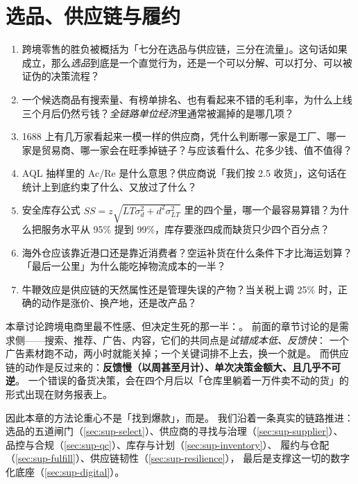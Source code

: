 \chapter{选品、供应链与履约}
\label{ch:supply}

\begin{insight}[本章要解决的问题]
\begin{enumerate}
  \item 跨境零售的胜负被概括为「七分在选品与供应链，三分在流量」。这句话如果成立，那么\emph{选品}到底是一个直觉行为，还是一个可以分解、可以打分、可以被证伪的决策流程？
  \item 一个候选商品有搜索量、有榜单排名、也有看起来不错的毛利率，为什么上线三个月后仍然亏钱？\emph{全链路单位经济}里通常被漏掉的是哪几项？
  \item 1688 上有几万家看起来一模一样的供应商，凭什么判断哪一家是工厂、哪一家是贸易商、哪一家会在旺季掉链子？与应该看什么、花多少钱、值不值得？
  \item AQL 抽样里的 Ac/Re 是什么意思？供应商说「我们按 2.5 收货」，这句话在统计上到底约束了什么、又放过了什么？
  \item 安全库存公式 $SS = z\sqrt{LT\sigma_d^2 + d^2\sigma_{LT}^2}$ 里的四个量，哪一个最容易算错？为什么把服务水平从 95\% 提到 99\%，库存要涨四成而缺货只少四个百分点？
  \item 海外仓应该靠近港口还是靠近消费者？空运补货在什么条件下才比海运划算？「最后一公里」为什么能吃掉物流成本的一半？
  \item 牛鞭效应是供应链的天然属性还是管理失误的产物？当关税上调 25\% 时，正确的动作是涨价、换产地，还是改产品？
\end{enumerate}
\end{insight}

本章讨论跨境电商里最不性感、但决定生死的那一半：。
前面的章节讨论的是需求侧——搜索、推荐、广告、内容，它们的共同点是\emph{试错成本低、反馈快}：
一个广告素材跑不动，两小时就能关掉；一个关键词排不上去，换一个就是。
而供应链的动作是反过来的：\textbf{反馈慢（以周甚至月计）、单次决策金额大、且几乎不可逆}。
一个错误的备货决策，会在四个月后以「仓库里躺着一万件卖不动的货」的形式出现在财务报表上。

因此本章的方法论重心不是「找到爆款」，而是。
我们沿着一条真实的链路推进：选品的五道闸门（\cref{sec:sup-select}）、供应商的寻找与治理（\cref{sec:sup-supplier}）、
品控与合规（\cref{sec:sup-qc}）、库存与计划（\cref{sec:sup-inventory}）、
履约与仓配（\cref{sec:sup-fulfill}）、供应链韧性（\cref{sec:sup-resilience}），
最后是支撑这一切的数字化底座（\cref{sec:sup-digital}）。

